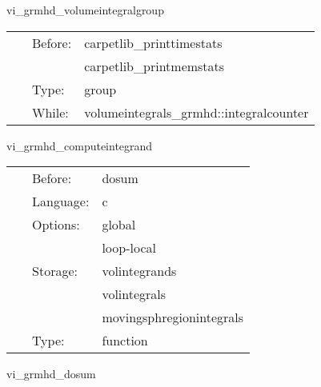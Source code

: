 \vspace{5mm}


\hspace{5mm} vi\_grmhd\_volumeintegralgroup 

\hspace{5mm}{\it evaluate all volume integrals } 


\hspace{5mm}

 \begin{tabular*}{160mm}{cll} 
~ & Before:  & carpetlib\_printtimestats \\ 
~& ~ &carpetlib\_printmemstats\\ 
~ & Type:  & group \\ 
~ & While:  & volumeintegrals\_grmhd::integralcounter \\ 
\end{tabular*} 


\vspace{5mm}


\hspace{5mm} vi\_grmhd\_computeintegrand 

\hspace{5mm}{\it compute integrand } 


\hspace{5mm}

 \begin{tabular*}{160mm}{cll} 
~ & Before:  & dosum \\ 
~ & Language:  & c \\ 
~ & Options:  & global \\ 
~& ~ &loop-local\\ 
~ & Storage:  & volintegrands \\ 
~& ~ &volintegrals\\ 
~& ~ &movingsphregionintegrals\\ 
~ & Type:  & function \\ 
\end{tabular*} 


\vspace{5mm}


\hspace{5mm} vi\_grmhd\_dosum 

\hspace{5mm}{\it do sum } 


